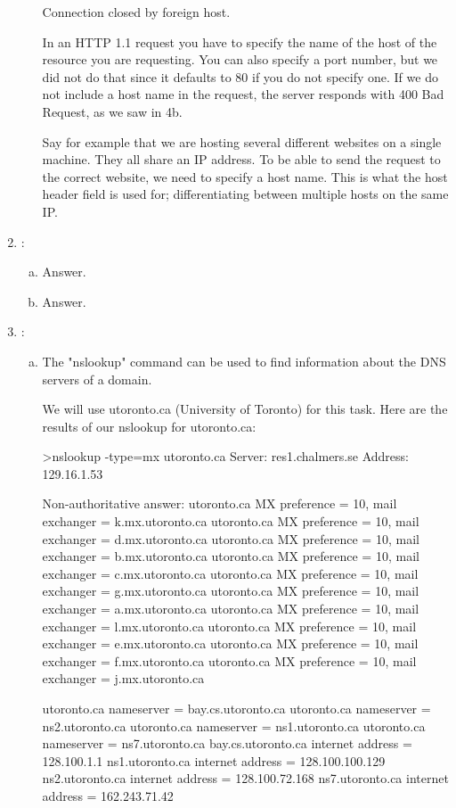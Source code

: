 \documentclass[a4paper,9pt,fleqn]{article}
\begin{document}
\begin{enumerate}[{Task} 1]
\begin{enumerate}[a)]
	Connection closed by foreign host.

	In an HTTP 1.1 request you have to specify the name of the host of the resource you are requesting. You can also specify a port number, but we did not do that since it defaults to 80 if you do not specify one. If we do not include a host name in the request, the server responds with 400 Bad Request, as we saw in 4b.

	Say for example that we are hosting several different websites on a single machine. They all share an IP address. To be able to send the request to the correct website, we need to specify a host name. This is what the host header field is used for; differentiating between multiple hosts on the same IP.

\end{enumerate}

\item :
\begin{enumerate}[a)]
\item 
Answer.  
\item 
Answer.
\end{enumerate}

\item :
\begin{enumerate}[a)]
\item 
The "nslookup" command can be used to find information about the DNS servers of a domain.

	We will use utoronto.ca (University of Toronto) for this task. 
	Here are the results of our nslookup for utoronto.ca:

	>nslookup -type=mx utoronto.ca
	Server:  res1.chalmers.se
	Address:  129.16.1.53

	Non-authoritative answer:
	utoronto.ca     MX preference = 10, mail exchanger = k.mx.utoronto.ca
	utoronto.ca     MX preference = 10, mail exchanger = d.mx.utoronto.ca
	utoronto.ca     MX preference = 10, mail exchanger = b.mx.utoronto.ca
	utoronto.ca     MX preference = 10, mail exchanger = c.mx.utoronto.ca
	utoronto.ca     MX preference = 10, mail exchanger = g.mx.utoronto.ca
	utoronto.ca     MX preference = 10, mail exchanger = a.mx.utoronto.ca
	utoronto.ca     MX preference = 10, mail exchanger = l.mx.utoronto.ca
	utoronto.ca     MX preference = 10, mail exchanger = e.mx.utoronto.ca
	utoronto.ca     MX preference = 10, mail exchanger = f.mx.utoronto.ca
	utoronto.ca     MX preference = 10, mail exchanger = j.mx.utoronto.ca

	utoronto.ca     nameserver = bay.cs.utoronto.ca
	utoronto.ca     nameserver = ns2.utoronto.ca
	utoronto.ca     nameserver = ns1.utoronto.ca
	utoronto.ca     nameserver = ns7.utoronto.ca
	bay.cs.utoronto.ca      internet address = 128.100.1.1
	ns1.utoronto.ca internet address = 128.100.100.129
	ns2.utoronto.ca internet address = 128.100.72.168
	ns7.utoronto.ca internet address = 162.243.71.42


\end{enumerate}
\end{enumerate}
\end{document}
